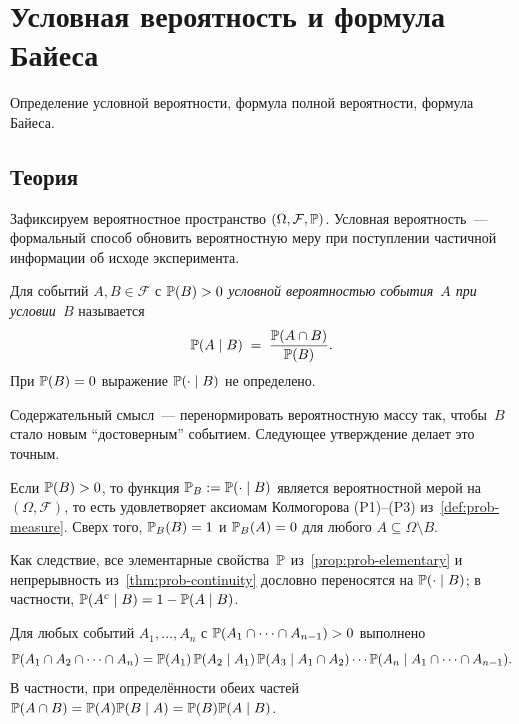
\section{Условная вероятность и формула Байеса}
\label{sec:1.2.02-conditional-bayes}

\begin{ticket}
Определение условной вероятности, формула полной вероятности, формула Байеса.
\end{ticket}

\subsection*{Теория}

Зафиксируем вероятностное пространство $(\Omega, \mathcal{F}, \mathbb{P})$. Условная вероятность~--- формальный способ обновить вероятностную меру при поступлении частичной информации об исходе эксперимента.

\begin{definition}
\label{def:conditional-probability}
Для событий $A, B \in \mathcal{F}$ с $\mathbb{P}(B) > 0$ \emph{условной вероятностью события~$A$ при условии~$B$} называется
\[
  \mathbb{P}(A \mid B) \;=\; \frac{\mathbb{P}(A \cap B)}{\mathbb{P}(B)}.
\]
При $\mathbb{P}(B) = 0$ выражение $\mathbb{P}(\cdot \mid B)$ не определено.
\end{definition}

Содержательный смысл~--- перенормировать вероятностную массу так, чтобы~$B$ стало новым ``достоверным'' событием. Следующее утверждение делает это точным.

\begin{proposition}
\label{prop:cond-is-measure}
Если $\mathbb{P}(B) > 0$, то функция $\mathbb{P}_B := \mathbb{P}(\cdot \mid B)$ является вероятностной мерой на $(\Omega, \mathcal{F})$, то есть удовлетворяет аксиомам Колмогорова (P1)--(P3) из~\cref{def:prob-measure}. Сверх того, $\mathbb{P}_B(B) = 1$ и $\mathbb{P}_B(A) = 0$ для любого $A \subseteq \Omega \setminus B$.
\end{proposition}

Как следствие, все элементарные свойства~$\mathbb{P}$ из~\cref{prop:prob-elementary} и непрерывность из~\cref{thm:prob-continuity} дословно переносятся на $\mathbb{P}(\cdot \mid B)$; в частности, $\mathbb{P}(A^c \mid B) = 1 - \mathbb{P}(A \mid B)$.

\begin{proposition}
\label{prop:multiplication-rule}
Для любых событий $A_1, \dots, A_n$ с $\mathbb{P}(A_1 \cap \cdots \cap A_{n-1}) > 0$ выполнено
\[
  \mathbb{P}(A_1 \cap A_2 \cap \cdots \cap A_n)
  = \mathbb{P}(A_1)\, \mathbb{P}(A_2 \mid A_1)\, \mathbb{P}(A_3 \mid A_1 \cap A_2) \cdots \mathbb{P}(A_n \mid A_1 \cap \cdots \cap A_{n-1}).
\]
В частности, при определённости обеих частей $\mathbb{P}(A \cap B) = \mathbb{P}(A) \mathbb{P}(B \mid A) = \mathbb{P}(B) \mathbb{P}(A \mid B)$.
\end{proposition}

